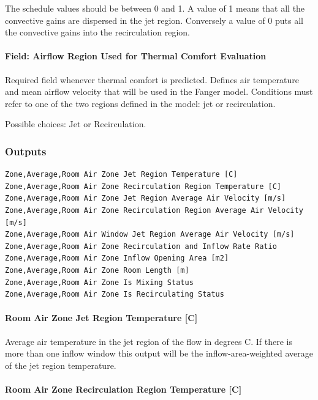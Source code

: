 The schedule values should be between 0 and 1. A value of 1 means that all the convective gains are dispersed in the jet region. Conversely a value of 0 puts all the convective gains into the recirculation region.

\paragraph{Field: Airflow Region Used for Thermal Comfort Evaluation}\label{field-airflow-region-used-for-thermal-comfort-evaluation}

Required field whenever thermal comfort is predicted. Defines air temperature and mean airflow velocity that will be used in the Fanger model. Conditions must refer to one of the two regions defined in the model: jet or recirculation.

Possible choices: Jet or Recirculation.

\subsubsection{Outputs}\label{outputs-030}

\begin{lstlisting}
Zone,Average,Room Air Zone Jet Region Temperature [C]
Zone,Average,Room Air Zone Recirculation Region Temperature [C]
Zone,Average,Room Air Zone Jet Region Average Air Velocity [m/s]
Zone,Average,Room Air Zone Recirculation Region Average Air Velocity [m/s]
Zone,Average,Room Air Window Jet Region Average Air Velocity [m/s]
Zone,Average,Room Air Zone Recirculation and Inflow Rate Ratio
Zone,Average,Room Air Zone Inflow Opening Area [m2]
Zone,Average,Room Air Zone Room Length [m]
Zone,Average,Room Air Zone Is Mixing Status
Zone,Average,Room Air Zone Is Recirculating Status
\end{lstlisting}

\paragraph{Room Air Zone Jet Region Temperature {[}C{]}}\label{room-air-zone-jet-region-temperature-c}

Average air temperature in the jet region of the flow in degrees C. If there is more than one inflow window this output will be the inflow-area-weighted average of the jet region temperature.

\paragraph{Room Air Zone Recirculation Region Temperature {[}C{]}}\label{room-air-zone-recirculation-region-temperature-c}

